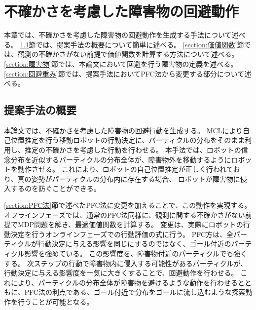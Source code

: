 \chapter{不確かさを考慮した障害物の回避動作} \label{chapter:mechod}
本章では、不確かさを考慮した障害物の回避動作を生成する手法について述べる。
\ref{section:method overview}節では、提案手法の概要について簡単に述べる。
\ref{section:価値関数}節では、観測の不確かさがない前提で価値関数を計算する方法について述べる。
\ref{section:障害物}節では、本論文において回避を行う障害物の定義を述べる。
\ref{section:回避重み}節では、提案手法においてPFC法から変更する部分について述べる。

\newpage


\section{提案手法の概要} \label{section:method overview}
本論文では、不確かさを考慮した障害物の回避行動を生成する。
MCLにより自己位置推定を行う移動ロボットの行動決定に、パーティクルの分布をそのまま利用し、推定の不確かさを考慮した行動を行わせる。
本手法では、ロボットの信念分布を近似するパーティクルの分布全体が、障害物外を移動するようにロボットを動作させる。
これにより、ロボットの自己位置推定が正しく行われており、真の姿勢がパーティクルの分布内に存在する場合、
ロボットが障害物に侵入するのを防ぐことができる。



\ref{section:PFC法}節で述べたPFC法に変更を加えることで、この動作を実現する。
オフラインフェーズでは、通常のPFC法同様に、観測に関する不確かさがない前提でMDP問題を解き、最適価値関数を計算する。
変更は、実際にロボットの行動決定を行うオンラインフェーズでの行動評価の式に行う。
PFC方は、全パーティクルが行動決定に与える影響を同じにするのではなく、ゴール付近のパーティクル影響を強めている。
この影響度を、障害物付近のパーティクルでも強くする。
次ステップの行動で障害物内に侵入する可能性があるパーティクルが、行動決定に与える影響度を一気に大きくすることで、回避動作を行わせる。
これにより、パーティクルの分布全体が障害物を避けるような動作を行わせるとともに、PFC法の利点である、ゴール付近で分布をゴールに流し込むような探索動作を行うことが可能となる。


